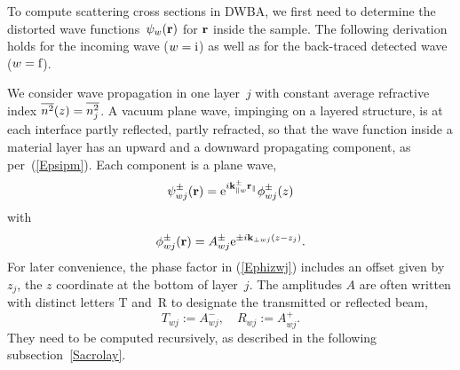 To compute scattering cross sections in DWBA,
we first need to determine the distorted wave functions~$\psi_w(\mathbf{r})$
for $\mathbf{r}$ inside the sample.
The following derivation holds for the incoming wave ($w=\text{i}$)
as well as for the back-traced detected wave ($w=\text{f}$).

We consider wave propagation in one layer~$j$
%
with constant average refractive index $\overline{n^2}(z)=\overline{n_j^2}$.
A vacuum plane wave, impinging on a layered structure,
is at each interface partly reflected, partly refracted,
so that the wave function inside a material layer
has an upward and a downward propagating component,
as per~(\ref{Epsipm}).
Each component is a plane wave,
\begin{equation}
  \psi^\pm_{wj}(\mathbf{r})=\text{e}^{i\mathbf{k}^\pm_{\parallel w}\mathbf{r}_\parallel}\phi^\pm_{wj}(z)
\end{equation}
with
\begin{equation}\label{Ephizwj}
  \phi^\pm_{wj}(\mathbf{r})=A^\pm_{wj}\text{e}^{\pm i\mathbf{k}_{\perp wj}(z-z_j)}.
\end{equation}
%
For later convenience,
the phase factor in (\ref{Ephizwj}) includes an offset
given by~$z_j$, the $z$ coordinate at the bottom of layer~$j$.
The amplitudes $A$ are often written with distinct letters
T and~R to designate the transmitted or reflected beam,
\begin{equation}
  T_{wj} := A^-_{wj},\quad
  R_{wj} := A^+_{wj}.
\end{equation}
%
%
They need to be computed recursively,
as described in the following subsection~\ref{Sacrolay}.

